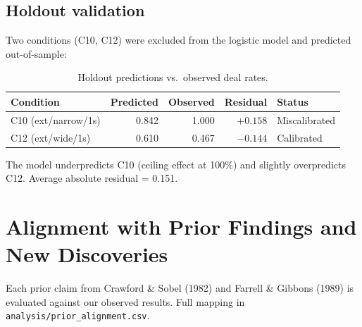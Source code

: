 \documentclass[11pt]{article}
\begin{document}
\subsection{Holdout validation}

Two conditions (C10, C12) were excluded from the logistic model and predicted out-of-sample:

\begin{table}[htbp]
\centering
\begin{tabular}{@{}l r r r l@{}}
\toprule
\textbf{Condition} & \textbf{Predicted} & \textbf{Observed} & \textbf{Residual} & \textbf{Status} \\
\midrule
C10 (ext/narrow/1s) & 0.842 & 1.000 & $+0.158$ & Miscalibrated \\
C12 (ext/wide/1s) & 0.610 & 0.467 & $-0.144$ & Calibrated \\
\bottomrule
\end{tabular}
\caption{Holdout predictions vs.\ observed deal rates.}
\label{tab:holdout}
\end{table}

The model underpredicts C10 (ceiling effect at 100\%) and slightly overpredicts C12. Average absolute residual = 0.151.

\section{Alignment with Prior Findings and New Discoveries}

Each prior claim from Crawford \& Sobel (1982) and Farrell \& Gibbons (1989) is evaluated against our observed results. Full mapping in \texttt{analysis/prior\_alignment.csv}.
\end{document}
